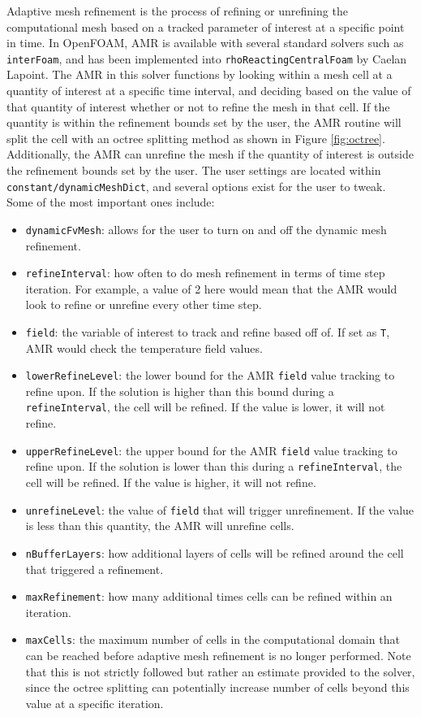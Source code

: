 Adaptive mesh refinement is the process of refining or unrefining the computational mesh based on a tracked parameter of interest at a specific point in time. In OpenFOAM, AMR is available with several standard solvers such as \verb|interFoam|, and has been implemented into \verb|rhoReactingCentralFoam| by Caelan Lapoint. The AMR in this solver functions by looking within a mesh cell at a quantity of interest at a specific time interval, and deciding based on the value of that quantity of interest whether or not to refine the mesh in that cell. If the quantity is within the refinement bounds set by the user, the AMR routine will split the cell with an octree splitting method as shown in Figure \ref{fig:octree}. Additionally, the AMR can unrefine the mesh if the quantity of interest is outside the refinement bounds set by the user. The user settings are located within \verb|constant/dynamicMeshDict|, and several options exist for the user to tweak. Some of the most important ones include:
\begin{itemize}
\item \verb|dynamicFvMesh|: allows for the user to turn on and off the dynamic mesh refinement. 
\item \verb|refineInterval|: how often to do mesh refinement in terms of time step iteration. For example, a value of 2 here would mean that the AMR would look to refine or unrefine every other time step. 
\item \verb|field|: the variable of interest to track and refine based off of. If set as \verb|T|, AMR would check the temperature field values.  
\item \verb|lowerRefineLevel|: the lower bound for the AMR \verb|field| value tracking to refine upon. If the solution is higher than this bound during a \verb|refineInterval|, the cell will be refined. If the value is lower, it will not refine. 
\item \verb|upperRefineLevel|: the upper bound for the AMR \verb|field| value tracking to refine upon. If the solution is lower than this during a \verb|refineInterval|, the cell will be refined. If the value is higher, it will not refine. 
\item \verb|unrefineLevel|: the value of \verb|field| that will trigger unrefinement. If the value is less than this quantity, the AMR will unrefine cells. 
\item \verb|nBufferLayers|: how additional layers of cells will be refined around the cell that triggered a refinement. 
\item \verb|maxRefinement|: how many additional times cells can be refined within an iteration. 
\item \verb|maxCells|: the maximum number of cells in the computational domain that can be reached before adaptive mesh refinement is no longer performed. Note that this is not strictly followed but rather an estimate provided to the solver, since the octree splitting can potentially increase number of cells beyond this value at a specific iteration.
\end{itemize}
